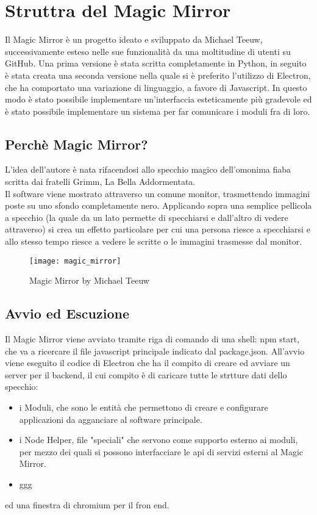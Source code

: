 \chapter{Struttra del Magic Mirror}

Il Magic Mirror è un progetto ideato e sviluppato da Michael Teeuw, successivamente esteso nelle sue funzionalità da una moltitudine di utenti su GitHub.
Una prima versione è stata scritta completamente in Python, in seguito è stata creata una seconda versione nella quale si è preferito l'utilizzo di Electron,
che ha comportato una variazione di linguaggio, a favore di Javascript. In questo modo è stato possibile implementare un'interfaccia esteticamente più gradevole
ed è stato possibile implementare un sistema per far comunicare i moduli fra di loro.
\\[2\baselineskip]
\section{Perchè Magic Mirror?}
L'idea dell'autore è nata rifacendosi allo specchio magico dell'omonima fiaba
scritta dai fratelli Grimm, La Bella Addormentata.\\
Il software viene mostrato attraverso un
comune monitor, trasmettendo immagini poste su uno sfondo completamente nero. Applicando sopra
una semplice pellicola a specchio (la quale da un lato permette di specchiarsi e dall'altro di vedere
attraverso) si crea un effetto particolare per cui una persona riesce a specchiarsi
e allo stesso tempo riesce a vedere le scritte o le immagini trasmesse dal monitor.
\\[2\baselineskip]
\begin{figure}[H]
    \texttt{[image: magic\_mirror]}
    \caption{Magic Mirror by Michael Teeuw}
\end{figure}

\section{Avvio ed Escuzione}
Il Magic Mirror viene avviato tramite riga di comando di una shell: npm start, che va a ricercare
il file javascript principale indicato dal package.json.
All'avvio viene eseguito il codice di Electron che ha il compito di creare ed avviare un server per il backend,
il cui compito è di caricare tutte le strtture dati dello specchio:
\begin{itemize}
\item i Moduli, che sono le entità che permettono di creare e configurare applicazioni da agganciare al software principale.
\item i Node Helper, file "speciali" che servono come supporto esterno ai moduli, per mezzo dei quali si possono interfacciare le api di servizi
esterni al Magic Mirror.
\item ggg\\[2\baselineskip]
\end{itemize}
ed una finestra di chromium per il fron end.
